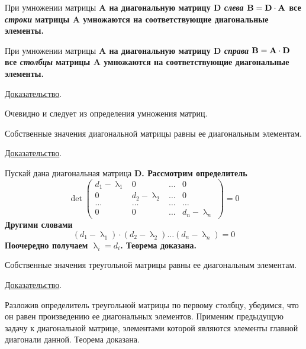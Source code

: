 \documentclass[../../calc-math-exam-2023.tex]{subfiles}
\begin{document}
    \begin{theorem}
        При умножении матрицы \bf{A} на диагональную матрицу \bf{D} \emph{слева} $\bf{B} = \bf{D} \cdot \bf{A}$
        все \emph{строки} матрицы \bf{A} умножаются на соответствующие диагональные элементы.

        При умножении матрицы \bf{A} на диагональную матрицу \bf{D} \emph{справа} $\bf{B} = \bf{A} \cdot \bf{D}$
        все \emph{столбцы} матрицы \bf{A} умножаются на соответствующие диагональные элементы.

        \underline{Доказательство}.
        \vspace{5pt}

        Очевидно и следует из определения умножения матриц.
    \end{theorem}

    \begin{theorem}
        Собственные значения диагональной матрицы равны ее диагональным элементам.

        \underline{Доказательство}.
        \vspace{5pt}

        Пускай дана диагональная матрица \bf{D}. Рассмотрим определитель
        \begin{equation*}
            \det
            \begin{pmatrix}
                d_1 - \uplambda_1 & 0                 & \dots & 0                 \\
                0                 & d_2 - \uplambda_2 & \dots & 0                 \\
                \dots             & \dots             & \dots & \dots             \\
                0                 & 0                 & \dots & d_n - \uplambda_n
            \end{pmatrix}
            = 0
        \end{equation*}
        Другими словами
        \begin{equation*}
            \left( d_1 - \uplambda_1 \right) \cdot \left( d_2 - \uplambda_2 \right) \dots \left( d_n - \uplambda_n \right) = 0
        \end{equation*}
        Поочередно получаем $\displaystyle \uplambda_i = d_i$. Теорема доказана.
    \end{theorem}

    \begin{theorem}
        Собственные значения треугольной матрицы равны ее диагональным элементам.

        \underline{Доказательство}.
        \vspace{5pt}

        Разложив определитель треугольной матрицы по первому столбцу, убедимся, что он равен произведению ее диагональных элементов.
        Применим предыдущую задачу к диагональной матрице, элементами которой являются элементы главной диагонали данной.
        Теорема доказана.
    \end{theorem}
\end{document}
